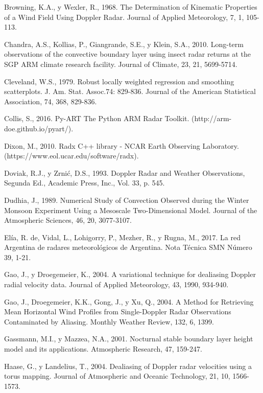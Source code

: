 \documentclass[12pt,spanish,oneside, a4paper]{book}
\begin{document}
\hypertarget{ref-Browning1968}{}
Browning, K.A., y Wexler, R., 1968. The Determination of Kinematic
Properties of a Wind Field Using Doppler Radar. Journal of Applied
Meteorology, 7, 1, 105-113.

\hypertarget{ref-Chandra2010}{}
Chandra, A.S., Kollias, P., Giangrande, S.E., y Klein, S.A., 2010.
Long-term observations of the convective boundary layer using insect
radar returns at the SGP ARM climate research facility. Journal of
Climate, 23, 21, 5699-5714.

\hypertarget{ref-Cleveland1979}{}
Cleveland, W.S., 1979. Robust locally weighted regression and smoothing
scatterplots. J. Am. Stat. Assoc.74: 829-836. Journal of the American
Statistical Association, 74, 368, 829-836.

\hypertarget{ref-Collis2016}{}
Collis, S., 2016. Py-ART The Python ARM Radar Toolkit.
(http://arm-doe.github.io/pyart/).

\hypertarget{ref-Dixon2010}{}
Dixon, M., 2010. Radx C++ library - NCAR Earth Observing Laboratory.
(https://www.eol.ucar.edu/software/radx).

\hypertarget{ref-Doviak1993}{}
Doviak, R.J., y Zrnić, D.S., 1993. Doppler Radar and Weather
Observations, Segunda Ed., Academic Press, Inc., Vol. 33, p. 545.

\hypertarget{ref-Dudhia1989}{}
Dudhia, J., 1989. Numerical Study of Convection Observed during the
Winter Monsoon Experiment Using a Mesoscale Two-Dimensional Model.
Journal of the Atmospheric Sciences, 46, 20, 3077-3107.

\hypertarget{ref-DeElia2017}{}
Elía, R. de, Vidal, L., Lohigorry, P., Mezher, R., y Rugna, M., 2017. La
red Argentina de radares meteorológicos de Argentina. Nota Técnica SMN
Número 39, 1-21.

\hypertarget{ref-Gao2004}{}
Gao, J., y Droegemeier, K., 2004. A variational technique for dealiasing
Doppler radial velocity data. Journal of Applied Meteorology, 43, 1990,
934-940.

\hypertarget{ref-Gao2004a}{}
Gao, J., Droegemeier, K.K., Gong, J., y Xu, Q., 2004. A Method for
Retrieving Mean Horizontal Wind Profiles from Single-Doppler Radar
Observations Contaminated by Aliasing. Monthly Weather Review, 132, 6,
1399.

\hypertarget{ref-Gassmann2001}{}
Gassmann, M.I., y Mazzea, N.A., 2001. Nocturnal stable boundary layer
height model and its applications. Atmospheric Research, 47, 159-247.

\hypertarget{ref-Haase2004}{}
Haase, G., y Landelius, T., 2004. Dealiasing of Doppler radar velocities
using a torus mapping. Journal of Atmospheric and Oceanic Technology,
21, 10, 1566-1573.
\end{document}
